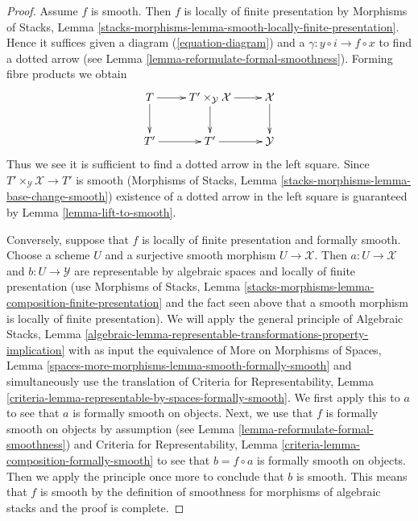 \documentclass[10pt,a4paper]{amsart}
\theoremstyle{plain}
\theoremstyle{definition}
\theoremstyle{remark}
\numberwithin{equation}{subsection}
\begin{document}
\begin{proof}
Assume $f$ is smooth. Then $f$ is locally of finite presentation by
Morphisms of Stacks, Lemma
\ref{stacks-morphisms-lemma-smooth-locally-finite-presentation}.
Hence it suffices given a diagram (\ref{equation-diagram})
and a $\gamma : y \circ i \to f \circ x$ to find a dotted
arrow (see Lemma \ref{lemma-reformulate-formal-smoothness}).
Forming fibre products we obtain
$$
\xymatrix{
T \ar[d] \ar[r] &
T' \times_\mathcal{Y} \mathcal{X} \ar[d] \ar[r] &
\mathcal{X} \ar[d] \\
T' \ar[r] & T' \ar[r] & \mathcal{Y}
}
$$
Thus we see it is sufficient to find a dotted arrow in the
left square. Since $T' \times_\mathcal{Y} \mathcal{X} \to T'$
is smooth
(Morphisms of Stacks, Lemma \ref{stacks-morphisms-lemma-base-change-smooth})
existence of a dotted arrow in the left square is guaranteed by
Lemma \ref{lemma-lift-to-smooth}.

\medskip\noindent
Conversely, suppose that $f$ is locally of finite presentation and
formally smooth. Choose a scheme $U$ and a surjective smooth morphism
$U \to \mathcal{X}$. Then $a : U \to \mathcal{X}$ and $b : U \to \mathcal{Y}$
are representable by algebraic spaces and locally of finite presentation
(use Morphisms of Stacks, Lemma
\ref{stacks-morphisms-lemma-composition-finite-presentation}
and the fact seen above
that a smooth morphism is locally of finite presentation).
We will apply the general principle of
Algebraic Stacks, Lemma
\ref{algebraic-lemma-representable-transformations-property-implication}
with as input the equivalence of More on Morphisms of Spaces,
Lemma \ref{spaces-more-morphisms-lemma-smooth-formally-smooth}
and simultaneously use the translation of
Criteria for Representability, Lemma
\ref{criteria-lemma-representable-by-spaces-formally-smooth}.
We first apply this to $a$ to see that $a$ is
formally smooth on objects. Next, we use that $f$ is
formally smooth on objects by assumption
(see Lemma \ref{lemma-reformulate-formal-smoothness})
and Criteria for Representability, Lemma
\ref{criteria-lemma-composition-formally-smooth}
to see that $b = f \circ a$ is formally smooth on objects.
Then we apply the principle once more to conclude that $b$ is smooth.
This means that $f$ is smooth by the definition of smoothness
for morphisms of algebraic stacks and the proof is complete.
\end{proof}
\end{document}
